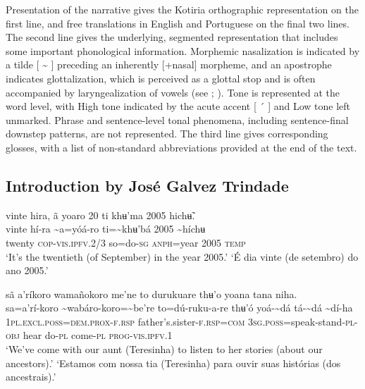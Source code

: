 \documentclass[output=paper,
modfonts,nonflat
]{langsci/langscibook}
\begin{document}
	Presentation of the narrative gives the Kotiria orthographic representation on the first line, and free translations in English and Portuguese on the final two lines. The second line gives the underlying, segmented representation that includes some important phonological information. Morphemic nasalization is indicated by a tilde [ {\textasciitilde} ] preceding an inherently [+nasal] morpheme, and an apostrophe indicates glottalization, which is perceived as a glottal stop and is often accompanied by laryngealization of vowels (see \citealt{Stenzel2007b}; \citealt{StenzelDemolin2013}). Tone is represented at the word level, with High tone indicated by the acute accent [ ´ ] and Low tone left unmarked. Phrase and sentence-level tonal phenomena, including sentence-final downstep patterns, are not represented. The third line gives corresponding glosses, with a list of non-standard abbreviations provided at the end of the text.

\newpage 
\subsection*{Introduction by José Galvez Trindade}
  
\ea
vinte hira, ã yoaro 20 ti khʉ'ma 2005 hichʉ̃.\\[.3em]
\gll vinte	hí-ra	{\textasciitilde}a=yóá-ro	ti={\textasciitilde}khʉ'bá	2005	{\textasciitilde}híchʉ\\
twenty	\textsc{cop-vis.ipfv.2/3}	so=do-\textsc{sg}	\textsc{anph}=year	2005	\textsc{temp}\\
\glt ‘It's the twentieth (of September) in the year 2005.’
\glt  ‘É dia vinte (de setembro) do ano 2005.’
\z

  
\ea sã a’ríkoro wamañokoro me'ne to durukuare thʉ'o yoana tana niha. \\[.3em]
\gll {\textasciitilde}sa=a’rí-koro	{\textasciitilde}wabáro-koro={\textasciitilde}be're	to=dú-ruku-a-re thʉ'ó	yoá-{\textasciitilde}dá	tá-{\textasciitilde}dá	{\textasciitilde}dí-ha\\
     \textsc{1pl.excl.poss=dem.prox-f.rsp}	father's.sister-\textsc{f.rsp=com}	\textsc{3sg.poss}=speak-stand-\textsc{pl-obj} hear	do-\textsc{pl}	come-\textsc{pl}	\textsc{prog-vis.ipfv.}1\\
\glt ‘We've come with our aunt{\footnotemark} (Teresinha) to listen to her stories (about our ancestors).’
\glt ‘Estamos com nossa tia (Teresinha) para ouvir suas histórias (dos ancestrais).’
\z 
\end{document}
